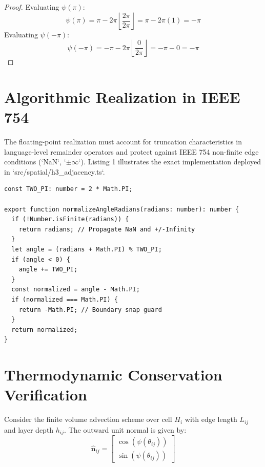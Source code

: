 \documentclass[10pt,journal,compsoc]{IEEEtran}
\begin{document}
\begin{proof}
Evaluating $\psi(\pi)$:
\begin{equation}
\psi(\pi) = \pi - 2\pi \left\lfloor \frac{2\pi}{2\pi} \right\rfloor = \pi - 2\pi(1) = -\pi
\end{equation}
Evaluating $\psi(-\pi)$:
\begin{equation}
\psi(-\pi) = -\pi - 2\pi \left\lfloor \frac{0}{2\pi} \right\rfloor = -\pi - 0 = -\pi
\end{equation}
\end{proof}

\section{Algorithmic Realization in IEEE 754}

The floating-point realization must account for truncation characteristics in language-level remainder operators and protect against IEEE 754 non-finite edge conditions (`NaN`, `$\pm\infty$`). Listing 1 illustrates the exact implementation deployed in `src/spatial/h3_adjacency.ts`.

\begin{lstlisting}[caption={Canonical Angular Normalization in TypeScript}, label={lst:ts_norm}]
const TWO_PI: number = 2 * Math.PI;

export function normalizeAngleRadians(radians: number): number {
  if (!Number.isFinite(radians)) {
    return radians; // Propagate NaN and +/-Infinity
  }
  let angle = (radians + Math.PI) % TWO_PI;
  if (angle < 0) {
    angle += TWO_PI;
  }
  const normalized = angle - Math.PI;
  if (normalized === Math.PI) {
    return -Math.PI; // Boundary snap guard
  }
  return normalized;
}
\end{lstlisting}

\section{Thermodynamic Conservation Verification}

Consider the finite volume advection scheme over cell $H_i$ with edge length $L_{ij}$ and layer depth $h_{ij}$. The outward unit normal is given by:
\begin{equation}
\hat{\mathbf{n}}_{ij} = \begin{bmatrix} \cos(\psi(\theta_{ij})) \\ \sin(\psi(\theta_{ij})) \end{bmatrix}
\end{equation}
\end{document}
